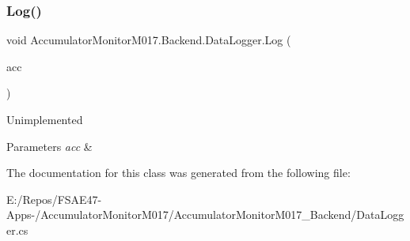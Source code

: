 \subsubsection{\texorpdfstring{Log()}{Log()}\hspace{0.1cm}{\footnotesize\ttfamily [2/2]}}
{\footnotesize\ttfamily void Accumulator\+Monitor\+M017.\+Backend.\+Data\+Logger.\+Log (\begin{DoxyParamCaption}\item[{\hyperlink{class_accumulator_monitor_m017_1_1_backend_1_1_accumulator_interface}{Accumulator\+Interface}}]{acc }\end{DoxyParamCaption})\hspace{0.3cm}{\ttfamily [inline]}}



Unimplemented 


\begin{DoxyParams}{Parameters}
{\em acc} & \\
\hline
\end{DoxyParams}


The documentation for this class was generated from the following file\+:\begin{DoxyCompactItemize}
\item 
E\+:/\+Repos/\+F\+S\+A\+E47-\/\+Apps-\//\+Accumulator\+Monitor\+M017/\+Accumulator\+Monitor\+M017\+\_\+\+Backend/Data\+Logger.\+cs\end{DoxyCompactItemize}
